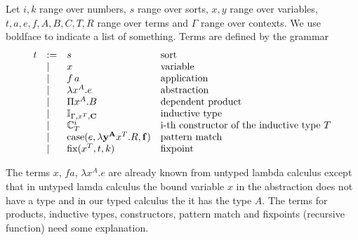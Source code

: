 \begin{definition}
  Let $i,k$ range over numbers, $s$ range over sorts, $x,y$ range over
  variables, $t, a, e, f, A, B, C, T, R$ range over terms and $\Gamma$ range
  over contexts. We use boldface to indicate a list of something. Terms are
  defined by the grammar
  $$
  \begin{array}{lllll}
    t &:= & s
    & \text{sort}

    \\

      & \mid & x
    & \text{variable}

    \\

      & \mid & f \, a
    & \text{application}

    \\

      & \mid & \lambda x^A. e
    & \text{abstraction}

    \\

      & \mid & \Pi x^A.B
    & \text{dependent product}

    \\

      & \mid & \Inductive_{\Gamma,x^T,\Cbold}
    & \text{inductive type}

    \\

      & \mid & \Constructor^i_T
    & \text{i-th constructor of the inductive type } T

    \\

      & \mid & \case(e, \lambda \ybold^\Abold x^T.R, \fbold)
    & \text{pattern match}

    \\

      & \mid & \fix(x^T, t, k)
    & \text{fixpoint}
  \end{array}
  $$
\end{definition}

The terms $x$, $f a$, $\lambda x^A.e$ are already known from untyped lambda
calculus except that in untyped lamda calculus the bound variable $x$ in the
abstraction does not have a type and in our typed calculus the it has the type
$A$. The terms for products, inductive types, constructors, pattern match and
fixpoints (recursive function) need some explanation.

